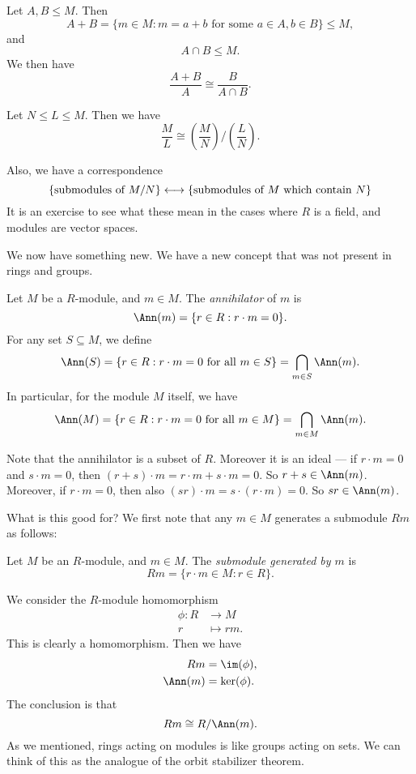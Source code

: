 \documentclass[a4paper]{article}
\begin{document}
\begin{thm}
  Let $A, B \leq M$. Then
  \[
    A + B = \{m \in M: m = a + b\text{ for some } a \in A, b \in B\} \leq M,
  \]
  and
  \[
    A \cap B \leq M.
  \]
  We then have
  \[
    \frac{A + B}{A} \cong \frac{B}{A \cap B}.
  \]
\end{thm}

\begin{thm}
  Let $N \leq L \leq M$. Then we have
  \[
    \frac{M}{L} \cong \left(\frac{M}{N}\right)\big/ \left(\frac{L}{N}\right).
  \]
\end{thm}

Also, we have a correspondence
\[
  \{\text{submodules of }M/N\} \longleftrightarrow\{\text{submodules of }M\text{ which contain }N\}\\
\]
It is an exercise to see what these mean in the cases where $R$ is a field, and modules are vector spaces.

We now have something new. We have a new concept that was not present in rings and groups.
\begin{defi}[Annihilator]
  Let $M$ be a $R$-module, and $m \in M$. The \emph{annihilator} of $m$ is
  \[
    \Ann(m) = \{r \in R: r \cdot m = 0\}.
  \]
  For any set $S \subseteq M$, we define
  \[
    \Ann(S) = \{r \in R: r \cdot m = 0\text{ for all }m \in S\} = \bigcap_{m \in S} \Ann(m).
  \]
  In particular, for the module $M$ itself, we have
  \[
    \Ann(M) = \{r \in R: r \cdot m = 0\text{ for all }m \in M\} = \bigcap_{m \in M} \Ann(m).
  \]
\end{defi}

Note that the annihilator is a subset of $R$. Moreover it is an ideal --- if $r \cdot m = 0$ and $s \cdot m = 0$, then $(r + s) \cdot m = r \cdot m + s \cdot m = 0$. So $r + s \in \Ann(m)$. Moreover, if $r \cdot m = 0$, then also $(sr) \cdot m = s \cdot (r \cdot m) = 0$. So $sr \in \Ann(m)$.

What is this good for? We first note that any $m \in M$ generates a submodule $Rm$ as follows:
\begin{defi}
  Let $M$ be an $R$-module, and $m \in M$. The \emph{submodule generated by $m$} is
  \[
    Rm = \{r \cdot m \in M: r \in R\}.
  \]
\end{defi}

We consider the $R$-module homomorphism
\begin{align*}
  \phi: R &\to M\\
  r &\mapsto rm.
\end{align*}
This is clearly a homomorphism. Then we have
\begin{align*}
  Rm &= \im(\phi),\\
  \Ann(m) &= \ker(\phi).
\end{align*}
The conclusion is that
\[
  Rm \cong R/\Ann(m).
\]
As we mentioned, rings acting on modules is like groups acting on sets. We can think of this as the analogue of the orbit stabilizer theorem.
\end{document}
